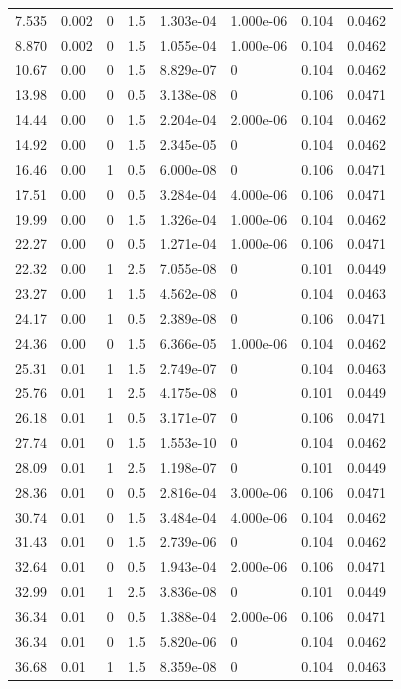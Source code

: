\documentclass[preview]{standalone}
\begin{document}
{{\begin{tabular}{L{1.2cm}C{1.2cm} C{0.3cm}C{0.5cm} C{1.4cm}C{1.4cm} C{1.4cm}C{1.4cm}}
  7.535  &  0.002  & 0     & 1.5 &  1.303e-04  & 1.000e-06  & 0.104 &  0.0462   \\ 
  8.870  &  0.002  & 0     & 1.5 &  1.055e-04  & 1.000e-06  & 0.104 &  0.0462   \\ 
  10.67  &  0.00  & 0     & 1.5 &  8.829e-07  & 0  & 0.104 &  0.0462   \\ 
  13.98  &  0.00  & 0     & 0.5 &  3.138e-08  & 0  & 0.106 &  0.0471   \\ 
  14.44  &  0.00  & 0     & 1.5 &  2.204e-04  & 2.000e-06  & 0.104 &  0.0462   \\ 
  14.92  &  0.00  & 0     & 1.5 &  2.345e-05  & 0  & 0.104 &  0.0462   \\ 
  16.46  &  0.00  & 1     & 0.5 &  6.000e-08  & 0  & 0.106 &  0.0471   \\ 
  17.51  &  0.00  & 0     & 0.5 &  3.284e-04  & 4.000e-06  & 0.106 &  0.0471   \\ 
  19.99  &  0.00  & 0     & 1.5 &  1.326e-04  & 1.000e-06  & 0.104 &  0.0462   \\ 
  22.27  &  0.00  & 0     & 0.5 &  1.271e-04  & 1.000e-06  & 0.106 &  0.0471   \\ 
  22.32  &  0.00  & 1     & 2.5 &  7.055e-08  & 0  & 0.101 &  0.0449   \\ 
  23.27  &  0.00  & 1     & 1.5 &  4.562e-08  & 0  & 0.104 &  0.0463   \\ 
  24.17  &  0.00  & 1     & 0.5 &  2.389e-08  & 0  & 0.106 &  0.0471   \\ 
  24.36  &  0.00  & 0     & 1.5 &  6.366e-05  & 1.000e-06  & 0.104 &  0.0462   \\ 
  25.31  &  0.01  & 1     & 1.5 &  2.749e-07  & 0  & 0.104 &  0.0463   \\ 
  25.76  &  0.01  & 1     & 2.5 &  4.175e-08  & 0  & 0.101 &  0.0449   \\ 
  26.18  &  0.01  & 1     & 0.5 &  3.171e-07  & 0  & 0.106 &  0.0471   \\ 
  27.74  &  0.01  & 0     & 1.5 &  1.553e-10  & 0  & 0.104 &  0.0462   \\ 
  28.09  &  0.01  & 1     & 2.5 &  1.198e-07  & 0  & 0.101 &  0.0449   \\ 
  28.36  &  0.01  & 0     & 0.5 &  2.816e-04  & 3.000e-06  & 0.106 &  0.0471   \\ 
  30.74  &  0.01  & 0     & 1.5 &  3.484e-04  & 4.000e-06  & 0.104 &  0.0462   \\ 
  31.43  &  0.01  & 0     & 1.5 &  2.739e-06  & 0  & 0.104 &  0.0462   \\ 
  32.64  &  0.01  & 0     & 0.5 &  1.943e-04  & 2.000e-06  & 0.106 &  0.0471   \\ 
  32.99  &  0.01  & 1     & 2.5 &  3.836e-08  & 0  & 0.101 &  0.0449   \\ 
  36.34  &  0.01  & 0     & 0.5 &  1.388e-04  & 2.000e-06  & 0.106 &  0.0471   \\ 
  36.34  &  0.01  & 0     & 1.5 &  5.820e-06  & 0  & 0.104 &  0.0462   \\ 
  36.68  &  0.01  & 1     & 1.5 &  8.359e-08  & 0  & 0.104 &  0.0463   \\ 
\hline 
\end{tabular} 

}}
\end{document}
